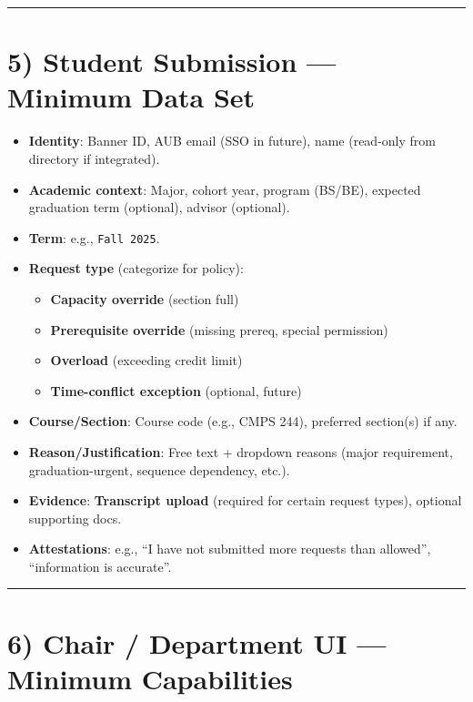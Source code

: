 \documentclass[12pt,a4paper]{article}
\begin{document}
\hrule

\section*{5) Student Submission --- Minimum Data Set}

\begin{itemize}
  \item \textbf{Identity}: Banner ID, AUB email (SSO in future), name (read-only from directory if integrated).
  \item \textbf{Academic context}: Major, cohort year, program (BS/BE), expected graduation term (optional), advisor (optional).
  \item \textbf{Term}: e.g., \texttt{Fall 2025}.
  \item \textbf{Request type} (categorize for policy):
  \begin{itemize}
    \item \textbf{Capacity override} (section full)
    \item \textbf{Prerequisite override} (missing prereq, special permission)
    \item \textbf{Overload} (exceeding credit limit)
    \item \textbf{Time-conflict exception} (optional, future)
  \end{itemize}
  \item \textbf{Course/Section}: Course code (e.g., CMPS 244), preferred section(s) if any.
  \item \textbf{Reason/Justification}: Free text + dropdown reasons (major requirement, graduation-urgent, sequence dependency, etc.).
  \item \textbf{Evidence}: \textbf{Transcript upload} (required for certain request types), optional supporting docs.
  \item \textbf{Attestations}: e.g., ``I have not submitted more requests than allowed'', ``information is accurate''.
\end{itemize}

\hrule

\section*{6) Chair / Department UI --- Minimum Capabilities}
\end{document}
